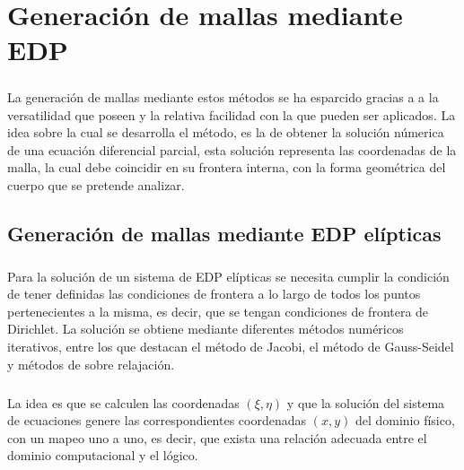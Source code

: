 \documentclass[letterpaper, openright, 12pt]{book}
\begin{document}
%
%
%
%
%

%
%
%
%
%
\chapter{Generación de mallas mediante EDP}
		\paragraph*{}
		La generación de mallas mediante estos métodos se ha esparcido gracias a a la versatilidad que poseen y la relativa facilidad con la que pueden ser aplicados. La idea sobre la cual se desarrolla el método, es la de obtener la solución númerica de una ecuación diferencial parcial, esta solución representa las coordenadas de la malla, la cual debe coincidir en su frontera interna, con la forma geométrica del cuerpo que se pretende analizar.\cite{siladic-grid-generation}
		
		\section{Generación de mallas mediante EDP elípticas}
			\paragraph*{}
				Para la solución de un sistema de EDP elípticas se necesita cumplir la condición de tener definidas las condiciones de frontera a lo largo de todos los puntos pertenecientes a la misma, es decir, que se tengan condiciones de frontera de Dirichlet.
				La solución se obtiene mediante diferentes métodos numéricos iterativos, entre los que destacan el método de Jacobi, el método de Gauss-Seidel y métodos de sobre relajación.
				
			\paragraph*{}
				La idea es que se calculen las coordenadas $(\xi, \eta)$ y que la solución del sistema de ecuaciones genere las correspondientes coordenadas $(x, y)$ del dominio físico, con un mapeo uno a uno, es decir, que exista una relación adecuada entre el dominio computacional y el lógico.
				
\end{document}

